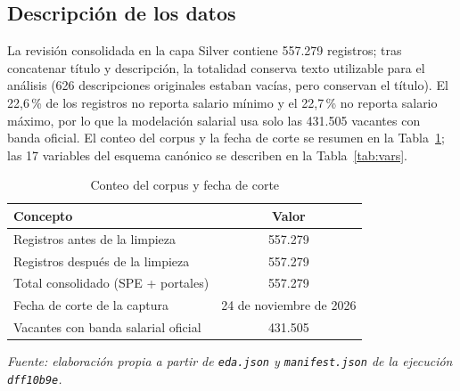\documentclass[journal]{IEEEtran}
\begin{document}
\subsection{Descripción de los datos}
La revisión consolidada en la capa Silver contiene 557.279 registros; tras concatenar título y descripción, la totalidad conserva texto utilizable para el análisis (626 descripciones originales estaban vacías, pero conservan el título). El 22,6\,\% de los registros no reporta salario mínimo y el 22,7\,\% no reporta salario máximo, por lo que la modelación salarial usa solo las 431.505 vacantes con banda oficial. El conteo del corpus y la fecha de corte se resumen en la Tabla~\ref{tab:corpus}; las 17 variables del esquema canónico se describen en la Tabla~\ref{tab:vars}.

\begin{table}[H]
\caption{Conteo del corpus y fecha de corte}
\label{tab:corpus}
\centering
\footnotesize
\renewcommand{\arraystretch}{1.15}
\begin{tabular}{p{}c}
\hline
\textbf{Concepto} & \textbf{Valor}\\
\hline
Registros antes de la limpieza & 557.279\\
Registros después de la limpieza & 557.279\\
Total consolidado (SPE + portales) & 557.279\\
Fecha de corte de la captura & 24 de noviembre de 2026\\
Vacantes con banda salarial oficial & 431.505\\
\hline
\end{tabular}

\vspace{2pt}
\textit{Fuente: elaboración propia a partir de \texttt{eda.json} y \texttt{manifest.json} de la ejecución \texttt{dff10b9e}.}
\end{table}
\end{document}
